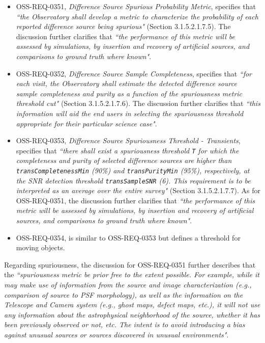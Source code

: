 \begin{itemize}

\item OSS-REQ-0351, {\it Difference Source Spurious Probability Metric}, specifies that {\it ``the Observatory shall develop a metric to characterize the probability of each reported difference source being spurious"} (Section 3.1.5.2.1.7.5).
The discussion further clarifies that {\it ``the performance of this metric will be assessed by simulations, by insertion and recovery of artificial sources, and comparisons to ground truth where known"}.

\item OSS-REQ-0352, {\it Difference Source Sample Completeness}, specifies that {\it ``for each visit, the Observatory shall estimate the detected difference source sample completeness and purity as a function of the spuriousness metric threshold cut"} (Section 3.1.5.2.1.7.6).
The discussion further clarifies that {\it ``this information will aid the end
users in selecting the spuriousness threshold appropriate for their particular science case"}.

\item OSS-REQ-0353, {\it Difference Source Spuriousness Threshold - Transients}, specifies that {\it ``there shall exist a spuriousness threshold {\tt T} for which the completeness and purity of selected difference sources are higher than {\tt transCompletenessMin} (90\%) and {\tt transPurityMin} (95\%), respectively, at the SNR detection threshold {\tt transSampleSNR} (6). This requirement is to be interpreted as an average over the entire survey"} (Section 3.1.5.2.1.7.7).
As for OSS-REQ-0351, the discussion further clarifies that {\it ``the performance of this metric will be assessed by simulations, by insertion and recovery of artificial sources, and comparisons to ground truth where known"}.

\item OSS-REQ-0354, is similar to OSS-REQ-0353 but defines a threshold for moving objects.

\end{itemize}

Regarding spuriousness, the discussion for OSS-REQ-0351 further describes that the {\it ``spuriousness metric be prior free to the extent possible. For example, while it may make use of information from the source and image characterization (e.g., comparison of source to PSF morphology), as well as the information on the Telescope and Camera system (e.g., ghost maps, defect maps, etc.), it will not use any information about the astrophysical neighborhood of the source, whether it has been previously observed or not, etc. The intent is to avoid introducing a bias against unusual sources or sources discovered in unusual environments"}.


